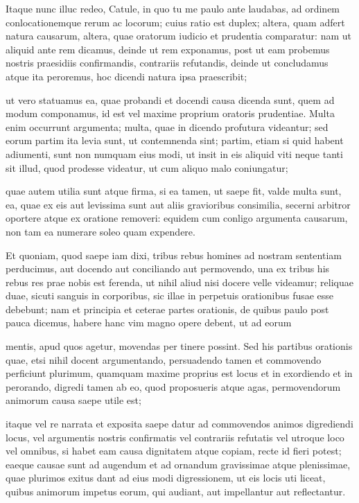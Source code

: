  Itaque nunc illuc redeo, Catule, in quo tu me paulo ante laudabas, ad ordinem conlocationemque rerum ac locorum; cuius ratio est duplex; altera, quam adfert natura causarum, altera, quae oratorum iudicio et prudentia comparatur: nam ut aliquid ante rem dicamus, deinde ut rem exponamus, post ut eam probemus nostris praesidiis confirmandis, contrariis refutandis, deinde ut concludamus atque ita peroremus, hoc dicendi natura ipsa praescribit;

 ut vero statuamus ea, quae probandi et docendi causa dicenda sunt, quem ad modum componamus, id est vel maxime proprium oratoris prudentiae. Multa enim occurrunt argumenta; multa, quae in dicendo profutura videantur; sed eorum partim ita levia sunt, ut contemnenda sint; partim, etiam si quid habent adiumenti, sunt non numquam eius modi, ut insit in eis aliquid viti neque tanti sit illud, quod prodesse videatur, ut cum aliquo malo coniungatur;

 quae autem utilia sunt atque firma, si ea tamen, ut saepe fit, valde multa sunt, ea, quae ex eis aut levissima sunt aut aliis gravioribus consimilia, secerni arbitror oportere atque ex oratione removeri: equidem cum conligo argumenta causarum, non tam ea numerare soleo quam expendere.

 Et quoniam, quod saepe iam dixi, tribus rebus homines ad nostram sententiam perducimus, aut docendo aut conciliando aut permovendo, una ex tribus his rebus res prae nobis est ferenda, ut nihil aliud nisi docere velle videamur; reliquae duae, sicuti sanguis in corporibus, sic illae in perpetuis orationibus fusae esse debebunt; nam et principia et ceterae partes orationis, de quibus paulo post pauca dicemus, habere hanc vim magno opere debent, ut ad eorum

 mentis, apud quos agetur, movendas per tinere possint. Sed his partibus orationis quae, etsi nihil docent argumentando, persuadendo tamen et commovendo perficiunt plurimum, quamquam maxime proprius est locus et in exordiendo et in perorando, digredi tamen ab eo, quod proposueris atque agas, permovendorum animorum causa saepe utile est;

 itaque vel re narrata et exposita saepe datur ad commovendos animos digrediendi locus, vel argumentis nostris confirmatis vel contrariis refutatis vel utroque loco vel omnibus, si habet eam causa dignitatem atque copiam, recte id fieri potest; eaeque causae sunt ad augendum et ad ornandum gravissimae atque plenissimae, quae plurimos exitus dant ad eius modi digressionem, ut eis locis uti liceat, quibus animorum impetus eorum, qui audiant, aut impellantur aut reflectantur.

